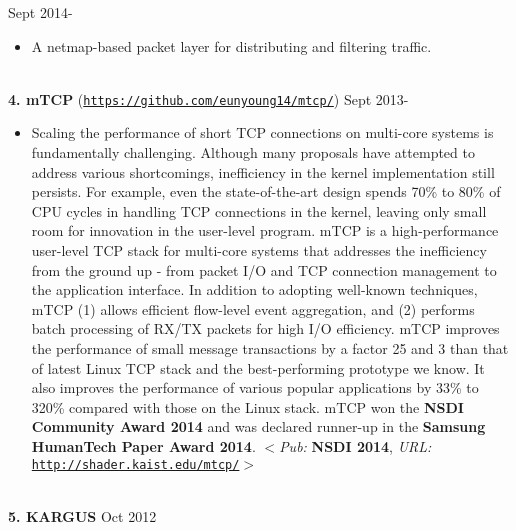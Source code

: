 \documentclass[10pt]{article}
\newenvironment{outerlist}[1][\enskip\textbullet]%
        {\begin{itemize}[#1]}{\end{itemize}%
         \vspace{-.6\baselineskip}}
\begin{document}
        \hfill {Sept 2014-}
\begin{outerlist}
\item[] {A netmap-based packet layer for distributing and filtering traffic.}
\end{outerlist} 
\ \\
{\textbf{4. m{TCP}}} (\href{https://github.com/eunyoung14/mtcp/}{\texttt{https://github.com/eunyoung14/mtcp/}})
        \hfill {Sept 2013-}
\begin{outerlist}
\item[] {Scaling the performance of short TCP connections on multi-core systems is fundamentally challenging. Although many proposals have attempted to address various shortcomings, inefficiency in the kernel implementation still persists. For example, even the state-of-the-art design spends 70\% to 80\% of CPU cycles in handling TCP connections in the kernel, leaving only small room for innovation in the user-level program. mTCP is a high-performance user-level TCP stack for multi-core systems that addresses the inefficiency from the ground up - from packet I/O and TCP connection management to the application interface. In addition to adopting well-known techniques, mTCP (1) allows efficient flow-level event aggregation, and (2) performs batch processing of RX/TX packets for high I/O efficiency. mTCP improves the performance of small message transactions by a factor 25 and 3 than that of latest Linux TCP stack and the best-performing prototype we know. It also improves the performance of various popular applications by 33\% to 320\% compared with those on the Linux stack. mTCP won the {\bf NSDI Community Award 2014} and was declared runner-up in the {\bf Samsung HumanTech Paper Award 2014}. $<$\textit{Pub:} {\bf NSDI 2014}, \textit{URL:} \href{http://shader.kaist.edu/mtcp/}{\texttt{http://shader.kaist.edu/mtcp/}}$>$} %
\end{outerlist}
\ \\
{\textbf{5. K{\footnotesize ARGUS}}}
        \hfill {Oct 2012}
\end{document}
